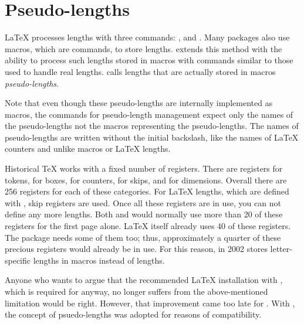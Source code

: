 \section{Pseudo-lengths}
\BeginIndexGroup
{}

\LaTeX{} processes lengths with three commands:
, 
and . Many packages also use macros,
which are commands, to store lengths. \KOMAScript{} extends this method with
the ability to process such lengths stored in macros with commands similar to
those used to handle real lengths. \KOMAScript{} calls lengths that are
actually stored in macros \emph{pseudo-lengths}.

Note that even though these pseudo-lengths are internally
implemented as macros, the commands for pseudo-length management expect only
the names of the pseudo-lengths not the macros representing the
pseudo-lengths. The names of pseudo-lengths are written without the initial
backslash, like the names of \LaTeX{} counters and unlike macros or \LaTeX{}
lengths.

\begin{Explain}
  Historical \TeX{} works with a fixed number of registers. There are
  registers for tokens, for boxes, for counters, for skips, and for
  dimensions. Overall there are 256 registers for each of these
  categories. For \LaTeX{} lengths, which are defined with ,
  skip registers are used. Once all these registers are in use, you can not
  define any more lengths. Both  and  would
  normally use more than 20 of these registers for the first page
  alone. \LaTeX{} itself already uses 40 of these registers. The
  \hyperref[cha:typearea]{}%
   package needs some of them too; thus, approximately
  a quarter of these precious registers would already be in use. For this
  reason, in 2002  stores letter-specific lengths in macros
  instead of lengths.

  Anyone who wants to argue that the recommended \LaTeX{} installation with
  \eTeX{}, which is required for \KOMAScript{} anyway, no longer suffers from
  the above-mentioned limitation would be right. However, that improvement
  came too late for . With , the concept of
  psuedo-lengths was adopted for reasons of compatibility.
\end{Explain}

